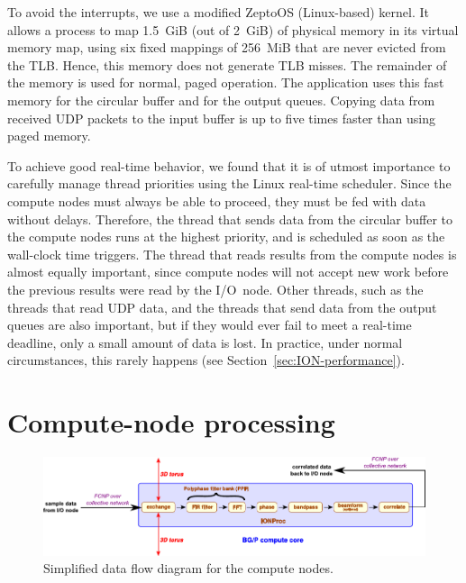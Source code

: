 \documentclass{sig-alternate}
\begin{document}
To avoid the interrupts, we use a modified ZeptoOS (Linux-based)
kernel\cite{Kazutomo:09}.
It allows a process to map 1.5~GiB (out of 2~GiB) of physical memory in its
virtual memory map, using six fixed mappings of 256~MiB that are never evicted
from the TLB.
Hence, this memory does not generate TLB misses.
The remainder of the memory is used for normal, paged operation.
The application uses this fast memory for the circular buffer and for the
output queues.
Copying data from received UDP packets to the input buffer is up to five times
faster than using paged memory.

To achieve good real-time behavior, we found that it is of utmost importance
to carefully manage thread priorities using the Linux real-time scheduler.
Since the compute nodes must always be able to proceed, they must be fed with
data without delays.
Therefore, the thread that sends data from the circular buffer to the
compute nodes runs at the highest priority, and is scheduled as soon as the
wall-clock time triggers.
The thread that reads results from the compute nodes is almost equally
important, since compute nodes will not accept new work before the previous
results were read by the I/O~node.
Other threads, such as the threads that read UDP data, and the threads that
send data from the output queues are also important, but if they would ever
fail to meet a real-time deadline, only a small amount of data is lost.
In practice, under normal circumstances, this rarely happens
(see Section~\ref{sec:ION-performance}).




\section{Compute-node processing}

\begin{figure}[ht]
\includegraphics[width=\textwidth]{CN-processing.pdf}
\caption{Simplified data flow diagram for the compute nodes.}
\label{fig:cn-processing}
\end{figure}
\end{document}
